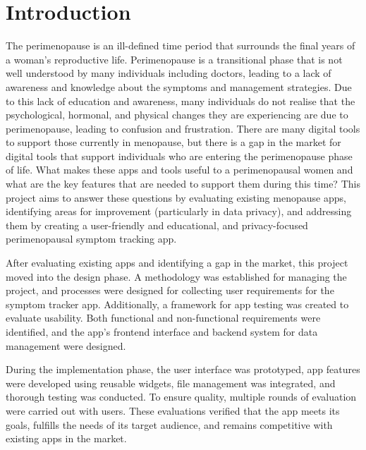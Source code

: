 \section{Introduction}

The perimenopause is an ill-defined time period that surrounds the final years of a woman's reproductive life\cite{Santoro2016}. Perimenopause is a transitional phase that is not well understood by many individuals including doctors, leading to a lack of awareness and knowledge about the symptoms and management strategies. Due to this lack of education and awareness, many individuals do not realise that the psychological, hormonal, and physical changes they are experiencing are due to perimenopause, leading to confusion and frustration\cite{Muir2022}. There are many digital tools to support those currently in menopause, but there is a gap in the market for digital tools that support individuals who are entering the perimenopause phase of life. What makes these apps and tools useful to a perimenopausal women and what are the key features that are needed to support them during this time? This project aims to answer these questions by evaluating existing menopause apps, identifying areas for improvement (particularly in data privacy), and addressing them by creating a user-friendly and educational, and privacy-focused perimenopausal symptom tracking app.

After evaluating existing apps and identifying a gap in the market, this project moved into the design phase. A methodology was established for managing the project, and processes were designed for collecting user requirements for the symptom tracker app. Additionally, a framework for app testing was created to evaluate usability. Both functional and non-functional requirements were identified, and the app’s frontend interface and backend system for data management were designed.  

During the implementation phase, the user interface was prototyped, app features were developed using reusable widgets, file management was integrated, and thorough testing was conducted. To ensure quality, multiple rounds of evaluation were carried out with users. These evaluations verified that the app meets its goals, fulfills the needs of its target audience, and remains competitive with existing apps in the market.